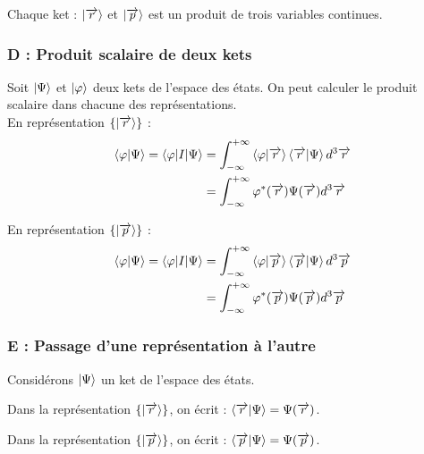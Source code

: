 \documentclass[12pt,a4paper,titlepage]{book}
\begin{document}
Chaque ket : $\ket{\overrightarrow{r}}$ et $\ket{\overrightarrow{p}}$ est un produit de trois variables continues.

\subsubsection{D : Produit scalaire de deux kets}

Soit $\ket\Psi$ et $\ket\varphi$ deux kets de l'espace des états. On peut calculer le produit scalaire dans chacune des représentations.\\

En représentation $\lbrace \ket{\overrightarrow{r}} \rbrace$ :
\begin{align*}
\braket{\varphi \vert \Psi} = \braket{\varphi \vert I \vert \Psi} &= \int_{- \infty}^{+ \infty} \braket{\varphi \vert \overrightarrow{r}} \braket{\overrightarrow{r} \vert \Psi} d^3 \overrightarrow{r}\\
&= \int_{- \infty}^{+ \infty} \varphi^* (\overrightarrow{r}) \Psi (\overrightarrow{r}) d^3 \overrightarrow{r}
\end{align*}

En représentation $\lbrace \ket{\overrightarrow{p}} \rbrace$ :
\begin{align*}
\braket{\varphi \vert \Psi} = \braket{\varphi \vert I \vert \Psi} &= \int_{- \infty}^{+ \infty} \braket{\varphi \vert \overrightarrow{p}} \braket{\overrightarrow{p} \vert \Psi} d^3 \overrightarrow{p}\\
&= \int_{- \infty}^{+ \infty} \varphi^* (\overrightarrow{p}) \Psi (\overrightarrow{p}) d^3 \overrightarrow{p}
\end{align*}

\subsubsection{E : Passage d'une représentation à l'autre}

Considérons $\ket\Psi$ un ket de l'espace des états.

Dans la représentation $\lbrace \ket{\overrightarrow{r}} \rbrace$, on écrit : $\braket{\overrightarrow{r} \vert \Psi} = \Psi (\overrightarrow{r})$.

Dans la représentation $\lbrace \ket{\overrightarrow{p}} \rbrace$, on écrit : $\braket{\overrightarrow{p} \vert \Psi} = \Psi (\overrightarrow{p})$.
\end{document}
